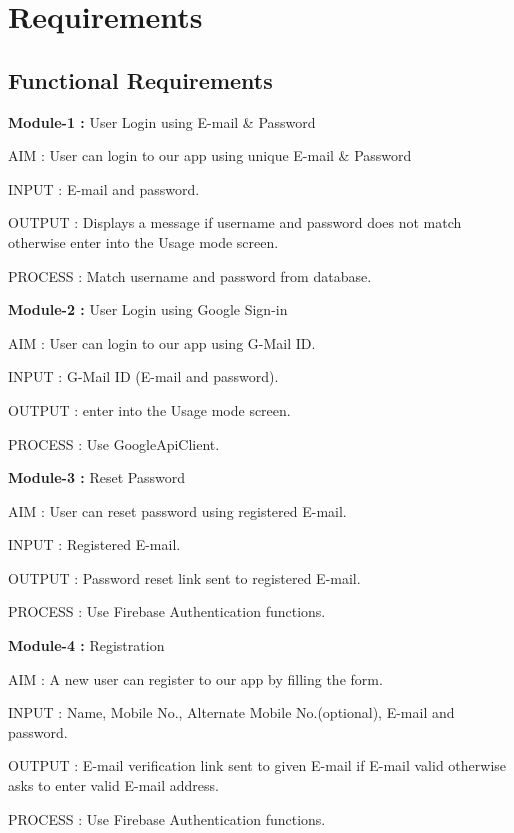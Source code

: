 \documentclass{report}
\begin{document}
\section{Requirements}

\subsection{Functional Requirements}

\noindent \newline
\textbf{Module-1 :} User Login using E-mail \& Password
\begin{description}
\item AIM : User can login to our app using unique E-mail \& Password
\item INPUT : E-mail and password.    
\item OUTPUT :  Displays a message if username and password does not match otherwise enter into the Usage mode screen.
\item PROCESS : Match username and password from database.
\end{description}

\noindent \newline \textbf{Module-2 :} User Login using Google Sign-in
\begin{description}
\item AIM : User can login to our app using G-Mail ID.
\item INPUT : G-Mail ID (E-mail and password).
\item OUTPUT : enter into the Usage mode screen.
\item PROCESS : Use GoogleApiClient.
\end{description}

\noindent \newline \textbf{Module-3 :} Reset Password
\begin{description}
\item AIM : User can reset password using registered E-mail.
\item INPUT : Registered E-mail.
\item OUTPUT : Password reset link sent to registered E-mail.
\item PROCESS : Use Firebase Authentication functions.
\end{description}

\noindent \newline \textbf{Module-4 :} Registration
\begin{description}
\item AIM : A new user can register to our app by filling the form.
\item INPUT : Name, Mobile No., Alternate Mobile No.(optional), E-mail and password.
\item OUTPUT : E-mail verification link sent to given E-mail if E-mail valid otherwise asks to enter valid E-mail address.
\item PROCESS : Use Firebase Authentication functions.
\end{description}
\end{document}
